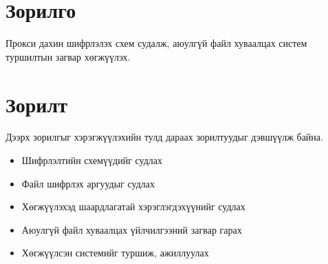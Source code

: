 \section*{Зорилго}
Прокси дахин шифрлэлэх схем судалж, аюулгүй файл хуваалцах систем туршилтын загвар хөгжүүлэх.

\section*{Зорилт}
Дээрх зорилгыг хэрэгжүүлэхийн тулд дараах зорилтуудыг дэвшүүлж байна.
\begin{itemize}
    \item Шифрлэлтийн схемүүдийг судлах
    \item Файл шифрлэх аргуудыг судлах
    \item Хөгжүүлэхэд шаардлагатай хэрэглэгдэхүүнийг судлах
    \item Аюулгүй файл хуваалцах үйлчилгээний загвар гарах
    \item Хөгжүүлсэн системийг туршиж, ажиллуулах
\end{itemize}
